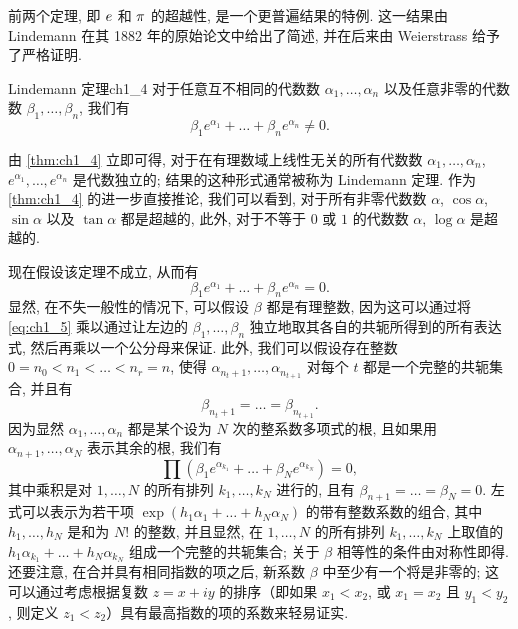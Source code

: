 前两个定理, 即 $e\index{transcendence of e}$ 和 $\pi\index{transcendence of  $\pi$}$ 的超越性, 是一个更普遍结果的特例. 这一结果由 Lindemann 在其 1882 年的原始论文中给出了简述, 并在后来由 Weierstrass 给予了严格证明.

\begin{mythm}{Lindemann 定理}{ch1_4}
对于任意互不相同的代数数 $\alpha_1, \dots, \alpha_n$ 以及任意非零的代数数 $\beta_1, \dots, \beta_n$, 我们有
\begin{equation*} 
\beta_1 e^{\alpha_1} + \dots + \beta_n e^{\alpha_n} \neq 0.
\end{equation*}
\end{mythm}

由 \autoref{thm:ch1_4} 立即可得, 对于在有理数域上线性无关的所有代数数 $\alpha_1, \dots, \alpha_n$, $e^{\alpha_1}, \dots, e^{\alpha_n}$ 是代数独立的; 结果的这种形式通常被称为 Lindemann 定理. 作为 \autoref{thm:ch1_4} 的进一步直接推论, 我们可以看到, 对于所有非零代数数 $\alpha$, $\cos \alpha$, $\sin \alpha$ 以及 $\tan \alpha$ 都是超越的, 此外, 对于不等于 $0$ 或 $1$ 的代数数 $\alpha$, $\log \alpha$ 是超越的.

现在假设该定理不成立, 从而有
\begin{equation} \label{eq:ch1_5}\tag{5}
\beta_1 e^{\alpha_1} + \dots + \beta_n e^{\alpha_n} = 0.
\end{equation}
显然, 在不失一般性的情况下, 可以假设 $\beta$ 都是有理整数, 因为这可以通过将 \eqref{eq:ch1_5} 乘以通过让左边的 $\beta_1, \dots, \beta_n$ 独立地取其各自的共轭所得到的所有表达式, 然后再乘以一个公分母来保证. 此外, 我们可以假设存在整数 $0 = n_0 < n_1 < \dots < n_r = n$, 使得 $\alpha_{n_t+1}, \dots, \alpha_{n_{t+1}}$ 对每个 $t$ 都是一个完整的共轭集合, 并且有
\[
\beta_{n_t+1} = \dots = \beta_{n_{t+1}}.
\]
因为显然 $\alpha_1, \dots, \alpha_n$ 都是某个设为 $N$ 次的整系数多项式的根, 且如果用 $\alpha_{n+1}, \dots, \alpha_N$ 表示其余的根, 我们有
\[
\prod (\beta_1 e^{\alpha_{k_1}} + \dots + \beta_N e^{\alpha_{k_N}}) = 0,
\]
其中乘积是对 $1, \dots, N$ 的所有排列 $k_1, \dots, k_N$ 进行的, 且有 $\beta_{n+1} = \dots = \beta_N = 0$. 左式可以表示为若干项 $\exp(h_1 \alpha_1 + \dots + h_N \alpha_N)$ 的带有整数系数的组合, 其中 $h_1, \dots, h_N$ 是和为 $N!$ 的整数, 并且显然, 在 $1, \dots, N$ 的所有排列 $k_1, \dots, k_N$ 上取值的 $h_1 \alpha_{k_1} + \dots + h_N \alpha_{k_N}$ 组成一个完整的共轭集合; 关于 $\beta$ 相等性的条件由对称性即得. 还要注意, 在合并具有相同指数的项之后, 新系数 $\beta$ 中至少有一个将是非零的; 这可以通过考虑根据复数 $z = x + iy$ 的排序（即如果 $x_1 < x_2$, 或 $x_1 = x_2$ 且 $y_1 < y_2$, 则定义 $z_1 < z_2$）具有最高指数的项的系数来轻易证实.

